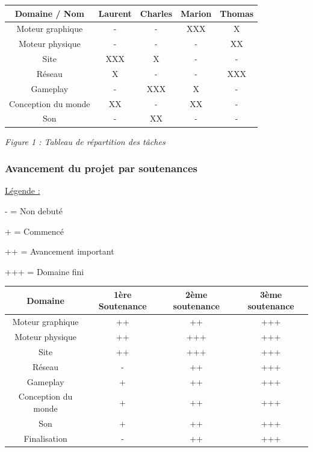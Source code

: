 \documentclass[a4paper , 12pt]{article}
\begin{document}
\begin{tabular}{|c||c|c|c|c|}
\hline Domaine / Nom & Laurent & Charles & Marion & Thomas \\ 
\hline Moteur graphique & - & - & XXX & X\\
\hline Moteur physique & - & - & - & XX\\
\hline Site & XXX & X & - & -\\
\hline Réseau & X & - & - & XXX\\
\hline Gameplay & - & XXX & X & -\\
\hline Conception du monde & XX & - & XX & -\\
\hline Son & - & XX & - & -\\
\hline


\end{tabular}

\quad

\begin{centering}

\textit{Figure 1 : Tableau de répartition des tâches}

\end{centering}

\newpage

	\subsubsection{Avancement du projet par soutenances}

\underline{Légende : } 

\quad
- = Non debuté

 \quad
+ = Commencé 

\quad
++ = Avancement important 

\quad
+++ = Domaine fini

 \quad

			\begin{tabular}{|c|c|c|c|}
\hline Domaine & 1ère Soutenance & 2ème soutenance & 3ème soutenance \\
\hline Moteur graphique & ++ & ++ & +++\\
\hline Moteur physique & ++ & +++ & +++\\
\hline Site & ++ & +++ & +++\\
\hline Réseau & - & ++ & +++\\
\hline Gameplay & + & ++ & +++\\
\hline Conception du monde & + & ++ & +++\\
\hline Son & + & ++ & +++\\
\hline Finalisation & - & ++ & +++ \\
\hline
			\end {tabular}
\end{document}
